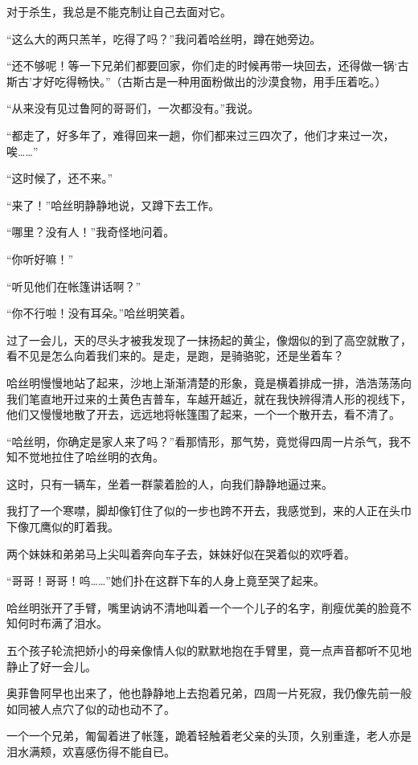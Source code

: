 \par 对于杀生，我总是不能克制让自己去面对它。
\par “这么大的两只羔羊，吃得了吗？”我问着哈丝明，蹲在她旁边。
\par “还不够呢！等一下兄弟们都要回家，你们走的时候再带一块回去，还得做一锅‘古斯古’才好吃得畅快。”（古斯古是一种用面粉做出的沙漠食物，用手压着吃。）
\par “从来没有见过鲁阿的哥哥们，一次都没有。”我说。
\par “都走了，好多年了，难得回来一趟，你们都来过三四次了，他们才来过一次，唉……”
\par “这时候了，还不来。”
\par “来了！”哈丝明静静地说，又蹲下去工作。
\par “哪里？没有人！”我奇怪地问着。
\par “你听好嘛！”
\par “听见他们在帐篷讲话啊？”
\par “你不行啦！没有耳朵。”哈丝明笑着。
\par 过了一会儿，天的尽头才被我发现了一抹扬起的黄尘，像烟似的到了高空就散了，看不见是怎么向着我们来的。是走，是跑，是骑骆驼，还是坐着车？
\par 哈丝明慢慢地站了起来，沙地上渐渐清楚的形象，竟是横着排成一排，浩浩荡荡向我们笔直地开过来的土黄色吉普车，车越开越近，就在我快辨得清人形的视线下，他们又慢慢地散了开去，远远地将帐篷围了起来，一个一个散开去，看不清了。
\par “哈丝明，你确定是家人来了吗？”看那情形，那气势，竟觉得四周一片杀气，我不知不觉地拉住了哈丝明的衣角。
\par 这时，只有一辆车，坐着一群蒙着脸的人，向我们静静地逼过来。
\par 我打了一个寒噤，脚却像钉住了似的一步也跨不开去，我感觉到，来的人正在头巾下像兀鹰似的盯着我。
\par 两个妹妹和弟弟马上尖叫着奔向车子去，妹妹好似在哭着似的欢呼着。
\par “哥哥！哥哥！呜……”她们扑在这群下车的人身上竟至哭了起来。
\par 哈丝明张开了手臂，嘴里讷讷不清地叫着一个一个儿子的名字，削瘦优美的脸竟不知何时布满了泪水。
\par 五个孩子轮流把娇小的母亲像情人似的默默地抱在手臂里，竟一点声音都听不见地静止了好一会儿。
\par 奥菲鲁阿早也出来了，他也静静地上去抱着兄弟，四周一片死寂，我仍像先前一般如同被人点穴了似的动也动不了。
\par 一个一个兄弟，匍匐着进了帐篷，跪着轻触着老父亲的头顶，久别重逢，老人亦是泪水满颊，欢喜感伤得不能自已。
